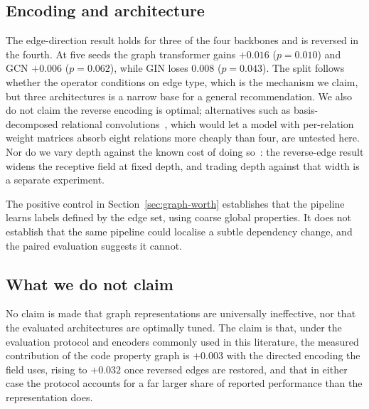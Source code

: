 \subsection{Encoding and architecture}
The edge-direction result holds for three of the four backbones and is
reversed in the fourth. At five seeds the graph transformer gains $+0.016$
($p=0.010$) and GCN $+0.006$ ($p=0.062$), while GIN loses $0.008$ ($p=0.043$).
The split follows whether the operator conditions on edge type, which is the
mechanism we claim, but three architectures is a narrow base for a general
recommendation. We also do not claim the reverse
encoding is optimal; alternatives such as basis-decomposed relational
convolutions~\citep{schlichtkrull2018modeling}, which would let a model with
per-relation weight matrices absorb eight relations more cheaply than four, are
untested here. Nor do we vary depth against the known cost of doing
so~\citep{oono2020graph,alon2021bottleneck}: the reverse-edge result widens the
receptive field at fixed depth, and trading depth against that width is a
separate experiment.

The positive control in Section~\ref{sec:graph-worth} establishes that the
pipeline learns labels defined by the edge set, using coarse global properties.
It does not establish that the same pipeline could localise a subtle dependency
change, and the paired evaluation suggests it cannot.

\subsection{What we do not claim}
No claim is made that graph representations are universally ineffective, nor that the evaluated architectures are optimally tuned. The claim is that, under the evaluation protocol and encoders commonly used in this literature, the measured contribution of the code property graph is $+0.003$ with the directed encoding the field uses, rising to $+0.032$ once reversed edges are restored, and that in either case the protocol accounts for a far larger share of reported performance than the representation does.

